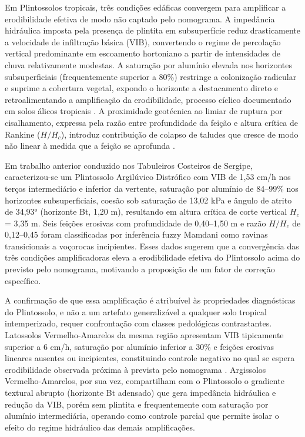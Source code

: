 \documentclass[
  brazilian,
  authoryear,
  preprint]{elsarticle}
\begin{document}
Em Plintossolos tropicais, três condições edáficas convergem para
amplificar a erodibilidade efetiva de modo não captado pelo nomograma. A
impedância hidráulica imposta pela presença de plintita em subsuperfície
reduz drasticamente a velocidade de infiltração básica (VIB),
convertendo o regime de percolação vertical predominante em escoamento
hortoniano a partir de intensidades de chuva relativamente modestas. A
saturação por alumínio elevada nos horizontes subsuperficiais
(frequentemente superior a 80\%) restringe a colonização radicular e
suprime a cobertura vegetal, expondo o horizonte a destacamento direto e
retroalimentando a amplificação da erodibilidade, processo cíclico
documentado em solos álicos tropicais \citep{cassol_et_al_2023}. A
proximidade geotécnica ao limiar de ruptura por cisalhamento, expressa
pela razão entre profundidade da feição e altura crítica de Rankine
(\(H/H_c\)), introduz contribuição de colapso de taludes que cresce de
modo não linear à medida que a feição se aprofunda
\citep{poesen_et_al_2003, sidorchuk_2006}.

Em trabalho anterior conduzido nos Tabuleiros Costeiros de Sergipe,
caracterizou-se um Plintossolo Argilúvico Distrófico com VIB de 1,53
cm/h nos terços intermediário e inferior da vertente, saturação por
alumínio de 84--99\% nos horizontes subsuperficiais, coesão sob
saturação de 13,02 kPa e ângulo de atrito de 34,93° (horizonte Bt, 1,20
m), resultando em altura crítica de corte vertical \(H_c\) = 3,35 m.
Seis feições erosivas com profundidade de 0,40--1,50 m e razão \(H/H_c\)
de 0,12--0,45 foram classificadas por inferência fuzzy Mamdani como
ravinas transicionais a voçorocas incipientes. Esses dados sugerem que a
convergência das três condições amplificadoras eleva a erodibilidade
efetiva do Plintossolo acima do previsto pelo nomograma, motivando a
proposição de um fator de correção específico.

A confirmação de que essa amplificação é atribuível às propriedades
diagnósticas do Plintossolo, e não a um artefato generalizável a
qualquer solo tropical intemperizado, requer confrontação com classes
pedológicas contrastantes. Latossolos Vermelho-Amarelos da mesma região
apresentam VIB tipicamente superior a 6 cm/h, saturação por alumínio
inferior a 30\% e feições erosivas lineares ausentes ou incipientes,
constituindo controle negativo no qual se espera erodibilidade observada
próxima à prevista pelo nomograma
\citep{silva_et_al_2009, bertoni_lombardi_neto_2017}. Argissolos
Vermelho-Amarelos, por sua vez, compartilham com o Plintossolo o
gradiente textural abrupto (horizonte Bt adensado) que gera impedância
hidráulica e redução da VIB, porém sem plintita e frequentemente com
saturação por alumínio intermediária, operando como controle parcial que
permite isolar o efeito do regime hidráulico das demais amplificações.
\end{document}
